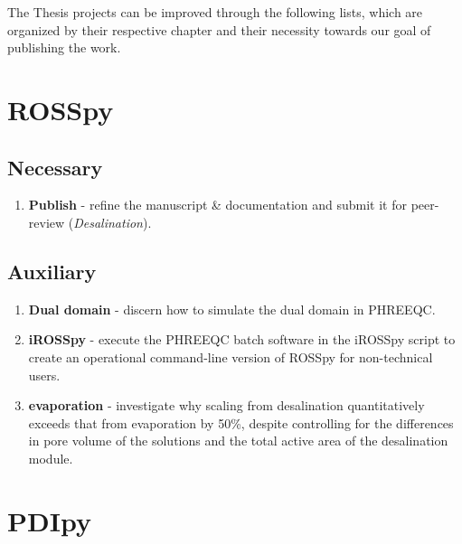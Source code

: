 
The Thesis projects can be improved through the following lists, which are organized by their respective chapter and their necessity towards our goal of publishing the work.

\section{ROSSpy}
\subsection{Necessary}
\begin{enumerate}
    \item \textbf{Publish} - refine the manuscript \& documentation and submit it for peer-review (\textit{Desalination}).
\end{enumerate}

\subsection{Auxiliary}
\begin{enumerate}
    \item \textbf{Dual domain} - discern how to simulate the dual domain in PHREEQC.
    \item \textbf{iROSSpy} - execute the PHREEQC batch software in the iROSSpy script to create an operational command-line version of ROSSpy for non-technical users.
    \item \textbf{evaporation} - investigate why scaling from desalination quantitatively exceeds that from evaporation by 50\%, despite controlling for the differences in pore volume of the solutions and the total active area of the desalination module.
\end{enumerate}

\section{PDIpy}
